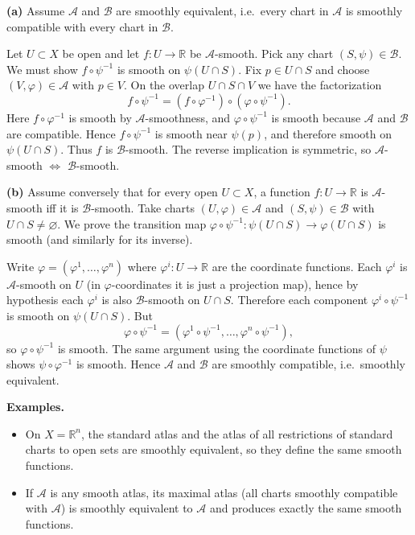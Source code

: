 \begin{solution}
\smallskip
\noindent\textbf{(a)}
Assume $\mathcal A$ and $\mathcal B$ are smoothly equivalent, i.e.\ every chart in $\mathcal A$ is smoothly compatible
with every chart in $\mathcal B$.

Let $U\subset X$ be open and let $f:U\to\mathbb R$ be $\mathcal A$-smooth.
Pick any chart $(S,\psi)\in\mathcal B$. We must show $f\circ\psi^{-1}$ is smooth on $\psi(U\cap S)$.
Fix $p\in U\cap S$ and choose $(V,\varphi)\in\mathcal A$ with $p\in V$.
On the overlap $U\cap S\cap V$ we have the factorization
\[
f\circ\psi^{-1}
=
(f\circ\varphi^{-1})\circ(\varphi\circ\psi^{-1}).
\]
Here $f\circ\varphi^{-1}$ is smooth by $\mathcal A$-smoothness, and $\varphi\circ\psi^{-1}$ is smooth
because $\mathcal A$ and $\mathcal B$ are compatible. Hence $f\circ\psi^{-1}$ is smooth near $\psi(p)$,
and therefore smooth on $\psi(U\cap S)$. Thus $f$ is $\mathcal B$-smooth.
The reverse implication is symmetric, so $\mathcal A$-smooth $\Leftrightarrow$ $\mathcal B$-smooth.

\smallskip
\noindent\textbf{(b)}
Assume conversely that for every open $U\subset X$, a function $f:U\to\mathbb R$ is $\mathcal A$-smooth iff it is $\mathcal B$-smooth.
Take charts $(U,\varphi)\in\mathcal A$ and $(S,\psi)\in\mathcal B$ with $U\cap S\neq\varnothing$.
We prove the transition map $\varphi\circ\psi^{-1}:\psi(U\cap S)\to\varphi(U\cap S)$ is smooth (and similarly for its inverse).

Write $\varphi=(\varphi^1,\dots,\varphi^n)$ where $\varphi^i:U\to\mathbb R$ are the coordinate functions.
Each $\varphi^i$ is $\mathcal A$-smooth on $U$ (in $\varphi$-coordinates it is just a projection map),
hence by hypothesis each $\varphi^i$ is also $\mathcal B$-smooth on $U\cap S$.
Therefore each component $\varphi^i\circ\psi^{-1}$ is smooth on $\psi(U\cap S)$.
But
\[
\varphi\circ\psi^{-1}=(\varphi^1\circ\psi^{-1},\dots,\varphi^n\circ\psi^{-1}),
\]
so $\varphi\circ\psi^{-1}$ is smooth. The same argument using the coordinate functions of $\psi$
shows $\psi\circ\varphi^{-1}$ is smooth. Hence $\mathcal A$ and $\mathcal B$ are smoothly compatible,
i.e.\ smoothly equivalent.

\medskip
\noindent\textbf{Examples.}
\begin{itemize}
	\item On $X=\mathbb R^n$, the standard atlas and the atlas of all restrictions of standard charts to open sets are smoothly equivalent,
	so they define the same smooth functions.
	\item If $\mathcal A$ is any smooth atlas, its maximal atlas (all charts smoothly compatible with $\mathcal A$)
	is smoothly equivalent to $\mathcal A$ and produces exactly the same smooth functions.
\end{itemize}



\end{solution}
